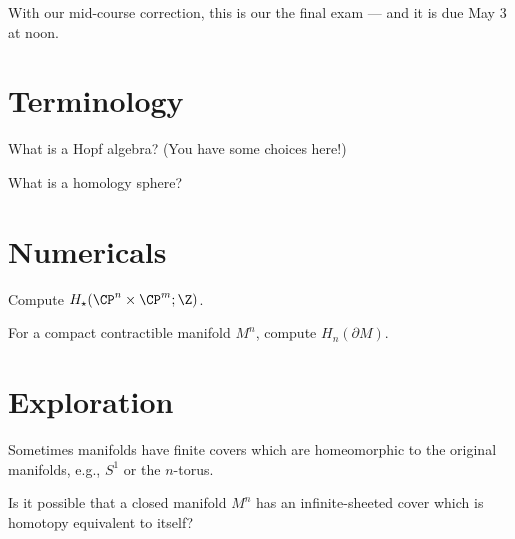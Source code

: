 \documentclass{homework}
\author{Jim Fowler}
\begin{document}
\maketitle

\begin{inspiration}
  With our mid-course correction, this is our the final exam --- and it is due May 3 at noon.
\end{inspiration}

\section{Terminology}

\begin{problem}
  What is a Hopf algebra?  (You have some choices here!)
\end{problem}

\begin{problem}
 What is a homology sphere? 
\end{problem}

\section{Numericals}

\begin{problem}
  Compute $H_\star(\CP^n \times \CP^m; \Z)$.
\end{problem}

\begin{problem}
  For a compact contractible manifold $M^n$, compute $H_n(\partial M)$.
\end{problem}

\section{Exploration}



\begin{problem}
  Sometimes manifolds have finite covers which are homeomorphic to the
  original manifolds, e.g., $S^1$ or the $n$-torus.

  Is it possible that a closed manifold $M^n$ has an infinite-sheeted
  cover which is homotopy equivalent to itself?
\end{problem}
\end{document}

